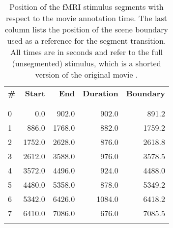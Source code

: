 \begin{table}
  \centering
  \begin{tabular}{lrrrr}
    \textbf{\#}  & \textbf{Start}  & \textbf{End}    & \textbf{Duration}& \textbf{Boundary} \\
  \\\hline\\
   0  & 0.0    & 902.0  & 902.0  & 891.2    \\
   1  & 886.0  & 1768.0 & 882.0  & 1759.2   \\
   2  & 1752.0 & 2628.0 & 876.0  & 2618.8   \\
   3  & 2612.0 & 3588.0 & 976.0  & 3578.5   \\
   4  & 3572.0 & 4496.0 & 924.0  & 4488.0   \\
   5  & 4480.0 & 5358.0 & 878.0  & 5349.2   \\
   6  & 5342.0 & 6426.0 & 1084.0 & 6418.2   \\
   7  & 6410.0 & 7086.0 & 676.0  & 7085.5   \\
   \\\hline
  \end{tabular}

  \caption{Position of the fMRI stimulus segments with respect to the movie
    annotation time. The last column lists the position of the scene boundary
    used as a reference for the segment transition. All times are in seconds
    and refer to the full (unsegmented) stimulus, which is a shorted version of
    the original movie \cite{HBI+14}.}

  \label{tab:timing}
\end{table}

